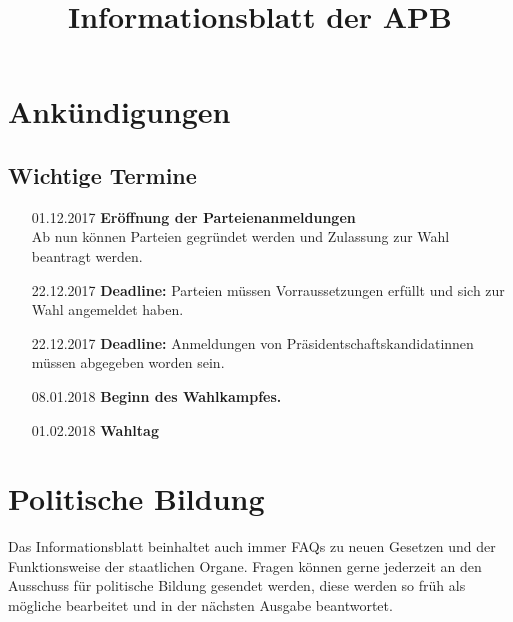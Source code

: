 \documentclass{sasbase}
\begin{document}
\title{Informationsblatt der APB}

\setcounter{secnumdepth}{5}

\mytitle

\parensstyle
\section{Ank\"{u}ndigungen}
\subsection*{Wichtige Termine}
\begin{enumerate}
	\item[01.12.2017] \textbf{Er\"{o}ffnung der Parteienanmeldungen}\\Ab nun k\"{o}nnen Parteien gegr\"{u}ndet werden und Zulassung zur Wahl beantragt werden.
	\item[22.12.2017] \textbf{Deadline:} Parteien m\"{u}ssen Vorraussetzungen erf\"{u}llt und sich zur Wahl angemeldet haben.
	\item[22.12.2017] \textbf{Deadline:} Anmeldungen von Pr\"{a}sidentschaftskandidatinnen m\"{u}ssen abgegeben worden sein.
	\item[08.01.2018] \textbf{Beginn des Wahlkampfes.}
	\item[01.02.2018] \textbf{Wahltag}
\end{enumerate}
\section{Politische Bildung}
Das Informationsblatt beinhaltet auch immer FAQs zu neuen Gesetzen und der Funktionsweise der staatlichen Organe.
Fragen k\"{o}nnen gerne jederzeit an den Ausschuss f\"{u}r politische Bildung gesendet werden, diese werden so fr\"{u}h als m\"{o}gliche bearbeitet und in der n\"{a}chsten Ausgabe beantwortet.
\end{document}

